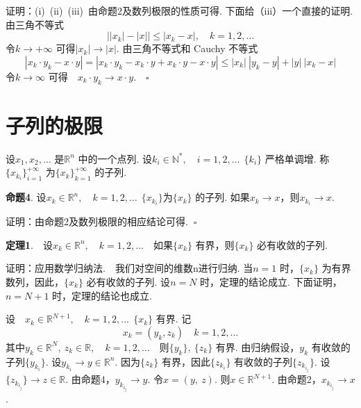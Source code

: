 \documentclass{article}
\begin{document}
\vspace{10pt}

\noindent 证明：(i)\ (ii)\ (iii)\ 由命题2及数列极限的性质可得. 下面给（iii）一个直接的证明. 由三角不等式
\begin{equation*}
    \left| | x_k | - | x | \right| \le | x_k - x |,\quad k = 1,2,\dots
\end{equation*}
令\(k \to + \infty \) 可得\(| x_k |\to | x |  \). 由三角不等式和 Cauchy 不等式
\begin{equation*}
    | x_k \cdot y_k - x \cdot y |= | x_k \cdot y_k - x_k \cdot y + x_k \cdot y - x \cdot y | \le | x_k |\ | y_k - y |+ | y |\ | x_k - x |
\end{equation*}
令\(k \to \infty \) 可得\ \ \(x_k \cdot y_k\to x \cdot y.\quad \square\)

\newpage

\section{子列的极限}
\noindent 设\(x_1,x_2,\dots \) 是\(\mathbb{R}^n\) 中的一个点列. 设\(k_i \in \mathbb{N}^{*},\quad i = 1,2,\dots \ \ \{k_i\} \) 严格单调增. 称\(\{x_{k_{i}}\}_{i = 1}^{ + \infty } \) 为\(\{x_k\}_{k = 1}^{ + \infty } \) 的子列.

\vspace{20pt}

\noindent \textbf{命题4}. 设\(x_k \in \mathbb{R}^n,\quad k = 1,2,\dots\ \ \{x_{k_{i}}\} \)为\(\{x_k\} \) 的子列. 如果\(x_k \to x\)，则\(x_{k_{i}}\to x\).

\vspace{20pt}

\noindent 证明：由命题2及数列极限的相应结论可得. \(\ \square\)

\newpage

\noindent \textbf{定理1}.\ \ 设\(x_k \in \mathbb{R}^n,\quad k = 1,2,\dots \)\ \ 如果\(\{x_k\} \) 有界，则\(\{x_k\} \) 必有收敛的子列.

\vspace{20pt}

\noindent 证明：应用数学归纳法.\ \ 我们对空间的维数n进行归纳. 当\(n = 1\) 时，\(\{x_k\} \) 为有界数列，因此，\(\{x_k\} \) 必有收敛的子列. 设\(n = N\) 时，定理的结论成立. 下面证明，\(n = N + 1\) 时，定理的结论也成立.

\vspace{20pt}

\noindent 设\ \ \(x_k \in \mathbb{R}^{N + 1},\quad k = 1,2,\dots\ \ \{x_k\}\) 有界. 记
\begin{equation*}
    x_k =(y_k,z_k)\quad k = 1,2,\dots
\end{equation*}
其中\(y_k \in \mathbb{R}^{N},\ z_k \in \mathbb{R},\quad k = 1,2,\dots \)\ \ 则\(\{y_k\},\ \{z_k\}  \) 有界. 由归纳假设，\(y_k\) 有收敛的子列\(\{y_{k_{i}}\}\). 设\(y_{k_{i}}\to y \in \mathbb{R}^n\). 因为\(\{z_k\} \) 有界，因此\(\{z_{k_{i}}\} \) 有收敛的子列\(\{z_{k_{i_{j}}}\} \). 设\(\{z_{k_{i_{j}}}\} \to z \in \mathbb{R}\). 由命题4，\(y_{k_{i_{j}}} \to y\). 令\(x =(y,\ z)\). 则\(x \in \mathbb{R}^{N + 1}\). 由命题2，\(x_{k_{i_{j}}}\to x\).
\end{document}
